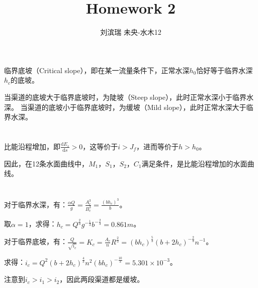 \documentclass[12pt, a4paper]{article}
\title{{\Huge{\textbf{Homework 2 \\}}}}
\author{刘滨瑞 \quad 2021012579 \quad 未央-水木12}
\newcommand{\di}{{\mathrm{d}}}
\begin{document}
\maketitle

    \section{}

        临界底坡（Critical slope），即在某一流量条件下，正常水深$h_0$恰好等于临界水深$h_c$的底坡。

        当渠道的底坡大于临界底坡时，为陡坡（Steep slope），此时正常水深小于临界水深。
        当渠道的底坡小于临界底坡时，为缓坡（Mild slope），此时正常水深大于临界水深。

    \section{}

        比能沿程增加，即$\frac{\di E_s}{\di s} > 0$，这等价于$i > J_f$，进而等价于$h > h_0$。

        因此，在12条水面曲线中，$M_1$，$S_1$，$S_2$，$C_1$满足条件，是比能沿程增加的水面曲线。

    \section{}

    \subsection{}

        对于临界水深，有：$\frac{\alpha Q}{g} = \frac{A_c^3}{B_c^3} = \frac{(b h_c)^3}{b}$。

        取$\alpha = 1$，求得：$h_c = Q^{\frac{2}{3}} g^{-\frac{1}{3}} b^{-\frac{2}{3}} = 0.861 m$。

        对于临界底坡，有：$\frac{Q}{\sqrt{i_c}} = K_c = \frac{A_c}{n} R^{\frac{2}{3}} = (b h_c)^{\frac{5}{3}} (b + 2 h_c)^{-\frac{2}{3}} n^{-1}$。

        求得：$i_c = Q^2 (b + 2 h_c)^{\frac{4}{3}} n^2 (b h_c)^{-\frac{10}{3}} = 5.301 \times 10^{-3}$。

        注意到$i_c > i_1 > i_2$，因此两段渠道都是缓坡。

    \subsection{}
\end{document}
